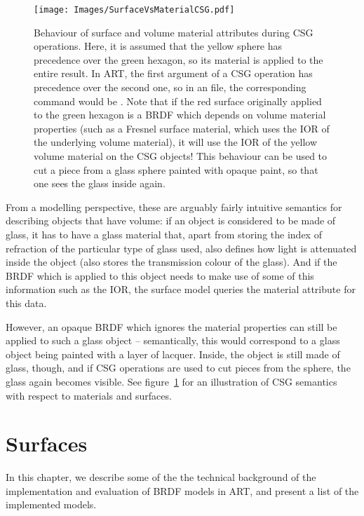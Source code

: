 \begin{figure}[htbp]
\begin{center}
\texttt{[image: Images/SurfaceVsMaterialCSG.pdf]} 
\end{center}
\caption{
\label{fig:surfacevsmaterialCSG} 
Behaviour of surface and volume material attributes during CSG operations. Here, it is assumed that the yellow sphere has precedence over the green hexagon, so its material is applied to the entire result. In ART, the first argument of a CSG operation has precedence over the second one, so in an  file, the corresponding command would \eg be . Note that if the red surface originally applied to the green hexagon is a BRDF which depends on volume material properties (such as a Fresnel surface material, which uses the IOR of the underlying volume material), it will use the IOR of the yellow volume material on the CSG objects! This behaviour can \eg be used to cut a piece from a glass sphere painted with opaque paint, so that one sees the glass inside again.
}
\end{figure}


From a modelling perspective, these are arguably fairly intuitive semantics for describing objects that have volume: if an object is considered to be made of glass, it has to have a glass material that, apart from storing the index of refraction of the particular type of glass used, also defines how light is attenuated inside the object (\ie also stores the transmission colour of the glass). And if the BRDF which is applied to this object needs to make use of some of this information such as the IOR, the surface model queries the material attribute for this data. 

However, an opaque BRDF which ignores the material properties can still be applied to such a glass object -- semantically, this would correspond to a glass object \eg being painted with a layer of lacquer. Inside, the object is still made of glass, though, and if CSG operations are used to cut pieces from the sphere, the glass again becomes visible. See figure~\ref{fig:surfacevsmaterialCSG} for an illustration of CSG semantics with respect to materials and surfaces.

\chapter{Surfaces}
\label{sec:Surfaces}

In this chapter, we describe some of the the technical background of the implementation and evaluation of BRDF models in ART, and present a list of the implemented models. 


